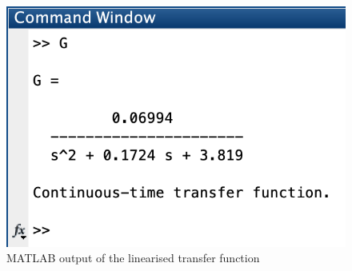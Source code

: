 \documentclass[11pt]{article}
\begin{document}
\begin{figure}[ht!]
    \centering
    \includegraphics[scale=0.5]{W2G.png}
    \caption{MATLAB output of the linearised transfer function}
    \label{fig:W2G}
\end{figure}
\end{document}
